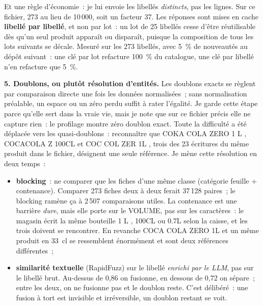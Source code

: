 \documentclass[11pt,a4paper]{article}
\begin{document}
Et une règle d'économie~: je lui envoie les libellés \emph{distincts}, pas les lignes. Sur ce
fichier, 273 au lieu de 10\,000, soit un facteur 37. Les réponses sont mises en cache
\textbf{libellé par libellé}, et non par lot~: un lot de 25 libellés cesse d'être réutilisable dès
qu'un seul produit apparaît ou disparaît, puisque la composition de tous les lots suivants se
décale. Mesuré sur les 273 libellés, avec 5~\% de nouveautés au dépôt suivant~: une clé par lot
refacture 100~\% du catalogue, une clé par libellé n'en refacture que 5~\%.

\textbf{5. Doublons, ou plutôt résolution d'entités.} Les doublons exacts se
règlent par comparaison directe une fois les données normalisées~; sans normalisation préalable, un
espace ou un zéro perdu suffit à rater l'égalité. Je garde cette étape parce qu'elle sert dans la
vraie vie, mais je note que sur ce fichier précis elle ne capture rien~: le profilage montre zéro
doublon exact. Toute la difficulté a été déplacée vers les quasi-doublons~: reconnaître que
\guillemotleft{} COKA COLA ZERO 1 L \guillemotright{}, \guillemotleft{} COCACOLA Z 100CL \guillemotright{} et \guillemotleft{} COC COL ZER 1L \guillemotright{}, trois des 23 écritures du même
produit dans le fichier, désignent une seule référence. Je mène cette résolution en deux temps~:
\begin{itemize}
  \item \textbf{blocking}~: ne comparer que les fiches d'une même classe (catégorie feuille +
        contenance). Comparer 273 fiches deux à deux ferait 37\,128 paires~; le blocking ramène
        ça à 2\,507 comparaisons utiles. La contenance est une barrière
        \emph{dure}, mais elle porte sur le VOLUME, pas sur les caractères~: le
        magasin écrit la même bouteille \guillemotleft{} 1 L \guillemotright{},
        \guillemotleft{} 100CL \guillemotright{} ou \guillemotleft{} 0.7L \guillemotright{} selon la caisse, et les trois
        doivent se rencontrer. En revanche
        \guillemotleft{} COCA COLA ZERO 1L \guillemotright{} et un même produit en 33~cl se ressemblent énormément
        et sont deux références différentes~;
  \item \textbf{similarité textuelle} (RapidFuzz) sur le libellé \emph{enrichi par le LLM}, pas
        sur le libellé brut. Au-dessus de 0,86 on fusionne, en dessous de 0,72 on sépare~; entre
        les deux, on ne fusionne pas et le doublon reste. C'est délibéré~: une fusion à tort est
        invisible et irréversible, un doublon restant se voit.
\end{itemize}
\end{document}
